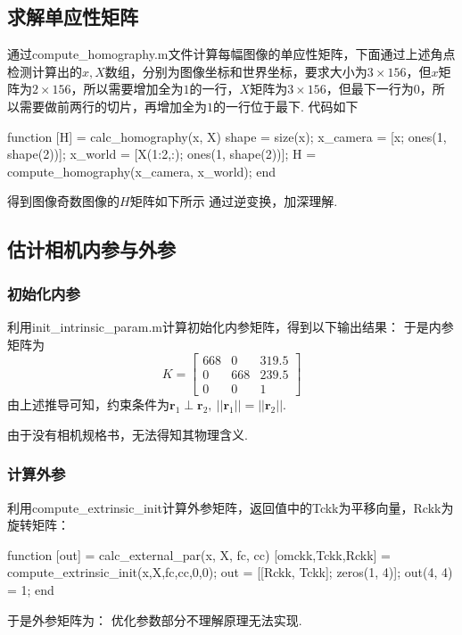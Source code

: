 \documentclass[12pt, a4paper, oneside]{ctexart}
\numberwithin{equation}{section}  %
\def\bd{\boldsymbol}        %
\begin{document}
\subsection{求解单应性矩阵}
通过compute\_homography.m文件计算每幅图像的单应性矩阵，下面通过上述角点检测计算出的$x,X$数组，分别为图像坐标和世界坐标，要求大小为$3\times 156$，但$x$矩阵为$2\times 156$，所以需要增加全为$1$的一行，$X$矩阵为$3\times 156$，但最下一行为$0$，所以需要做前两行的切片，再增加全为$1$的一行位于最下. 代码如下
\begin{matlabcode}
function [H] = calc_homography(x, X)
    shape = size(x);
    x_camera = [x; ones(1, shape(2))];
    x_world = [X(1:2,:); ones(1, shape(2))];
    H = compute_homography(x_camera, x_world);
end
\end{matlabcode}
得到图像奇数图像的$H$矩阵如下所示
通过逆变换，加深理解.
\subsection{估计相机内参与外参}
\subsubsection{初始化内参}
利用init\_intrinsic\_param.m计算初始化内参矩阵，得到以下输出结果：
于是内参矩阵为
\begin{equation*}
    K = \left[\begin{matrix}
        668&0&319.5\\
        0&668&239.5\\
        0&0&1
    \end{matrix}\right]
\end{equation*}
由上述推导可知，约束条件为$\bd{r}_1\perp \bd{r}_2,\ ||\bd{r}_1|| = ||\bd{r}_2||$.

由于没有相机规格书，无法得知其物理含义.
\subsubsection{计算外参}
利用compute\_extrinsic\_init计算外参矩阵，返回值中的Tckk为平移向量，Rckk为旋转矩阵：
\begin{matlabcode}
function [out] = calc_external_par(x, X, fc, cc)
    [omckk,Tckk,Rckk] = compute_extrinsic_init(x,X,fc,cc,0,0);
    out = [[Rckk, Tckk]; zeros(1, 4)];
    out(4, 4) = 1;
end
\end{matlabcode}
于是外参矩阵为：
优化参数部分不理解原理无法实现.
\end{document}
